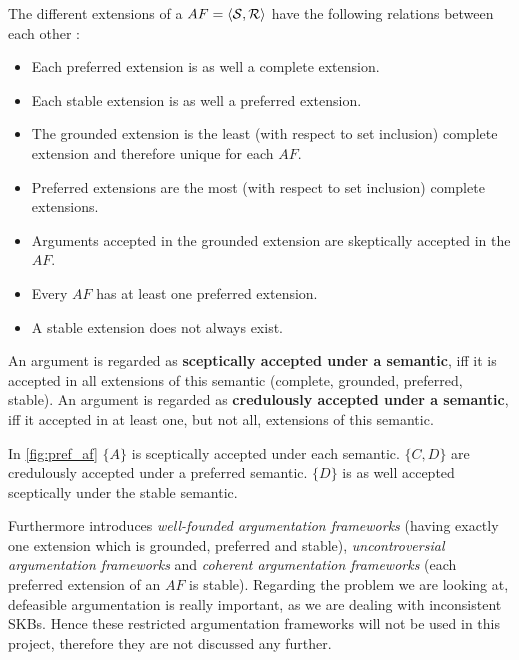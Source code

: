 \begin{remark}
The different extensions of a $AF = \langle \mathcal{S}, \mathcal{R} \rangle$ have the following relations between each other \cite{dung1995}:
\begin{itemize} 
	\item Each preferred extension is as well a complete extension.
	\item Each stable extension is as well a preferred extension.
	\item The grounded extension is the least (with respect to set inclusion) complete extension and therefore unique for each $AF$.
	\item Preferred extensions are the most (with respect to set inclusion) complete extensions.
	\item Arguments accepted in the grounded extension are skeptically accepted in the $AF$.
	\item Every $AF$ has at least one preferred extension.
	\item A stable extension does not always exist.
\end{itemize}
\end{remark}

\begin{definition}
An argument is regarded as \textbf{sceptically accepted under a semantic}, iff it is accepted in all extensions of this semantic (complete, grounded, preferred, stable). An argument is regarded as \textbf{credulously accepted under a semantic}, iff it accepted in at least one, but not all, extensions of this semantic. 	
\end{definition}

\begin{exa}
In \autoref{fig:pref_af} $\{A\}$ is sceptically accepted under each semantic. $\{C, D\}$ are credulously accepted under a preferred semantic. $\{D\}$ is as well accepted sceptically under the stable semantic.
\end{exa}


Furthermore \cite{dung1995} introduces \textit{well-founded argumentation frameworks} (having exactly one extension which is grounded, preferred and stable), \textit{uncontroversial argumentation frameworks} and \textit{coherent argumentation frameworks} (each preferred extension of an $AF$ is stable). Regarding the problem we are looking at, defeasible argumentation is really important, as we are dealing with inconsistent \glspl{SKB}. Hence these restricted argumentation frameworks will not be used in this project, therefore they are not discussed any further.

